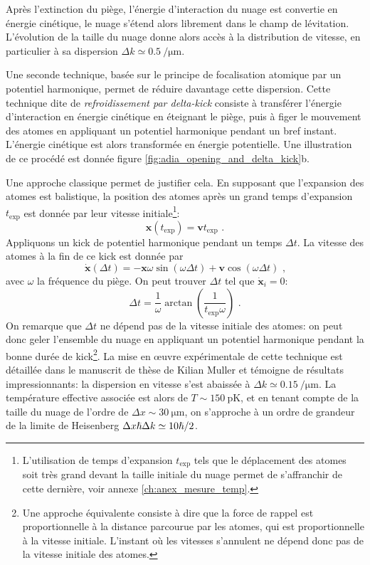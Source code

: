 Après l'extinction du piège, l'énergie d'interaction du nuage est convertie en énergie cinétique, le nuage s'étend alors librement dans le champ de lévitation. L'évolution de la taille du nuage donne alors accès à la distribution de vitesse, en particulier à sa dispersion $\Delta k \simeq \SI{0.5}{\per\micro\metre}$. 

Une seconde technique, basée sur le principe de focalisation atomique par un potentiel harmonique, permet de réduire davantage cette dispersion. Cette technique dite de \emph{refroidissement par delta-kick} consiste à transférer l'énergie d'interaction en énergie cinétique en éteignant le piège, puis à figer le mouvement des atomes en appliquant un potentiel harmonique pendant un bref instant. L'énergie cinétique est alors transformée en énergie potentielle. Une illustration de ce procédé est donnée figure \ref{fig:adia_opening_and_delta_kick}b.

Une approche classique permet de justifier cela. En supposant que l'expansion des atomes est balistique, la position des atomes après un grand temps d'expansion $t_{\mathrm{exp}}$ est donnée par leur vitesse initiale\footnote{L'utilisation de temps d'expansion $t_{\mathrm{exp}}$ tels que le déplacement des atomes soit très grand devant la taille initiale du nuage permet de s'affranchir de cette dernière, voir annexe \ref{ch:anex_mesure_temp}.}:
\begin{equation}
\mathbf{x}(t_{\mathrm{exp}})=\mathbf{v} t_{\mathrm{exp}} \text{ .}
\end{equation}
Appliquons un kick de potentiel harmonique pendant un temps $\Delta t$. La vitesse des atomes à la fin de ce kick est donnée par
\begin{equation}
\dot{\mathbf{x}}(\Delta t) = -\mathbf{x} \omega \sin{(\omega \Delta t)}+ \mathbf{v} \cos{(\omega \Delta t)} \text{ ,}
\end{equation}
avec $\omega$ la fréquence du piège.
On peut trouver $\Delta t$ tel que $\dot{\mathbf{x}}_i=0$:
\begin{equation}
\Delta t= \frac{1}{\omega} \arctan{\left(\frac{1}{t_{\mathrm{exp}} \omega} \right)} \text{ .}
\end{equation}
On remarque que $\Delta t$ ne dépend pas de la vitesse initiale des atomes: on peut donc geler l'ensemble du nuage en appliquant un potentiel harmonique pendant la bonne durée de kick\footnote{Une approche équivalente consiste à dire que la force de rappel est proportionnelle à la distance parcourue par les atomes, qui est proportionnelle à la vitesse initiale. L'instant où les vitesses s'annulent ne dépend donc pas de la vitesse initiale des atomes.}. 
La mise en œuvre expérimentale de cette technique est détaillée dans le manuscrit de thèse de Kilian Muller \citep{muller2015coherent} et témoigne de résultats impressionnants: la dispersion en vitesse s'est abaissée à $\Delta k \simeq \SI{0.15}{\per\micro\metre}$. La température effective associée est alors de $T\sim \SI{150}{\pico\kelvin}$, et en tenant compte de la taille du nuage de l'ordre de $\Delta x \sim \SI{30}{\micro\metre}$, on s'approche à un ordre de grandeur de la limite de Heisenberg $\Delta x \hslash \Delta k \simeq 10 \hslash /2$.

